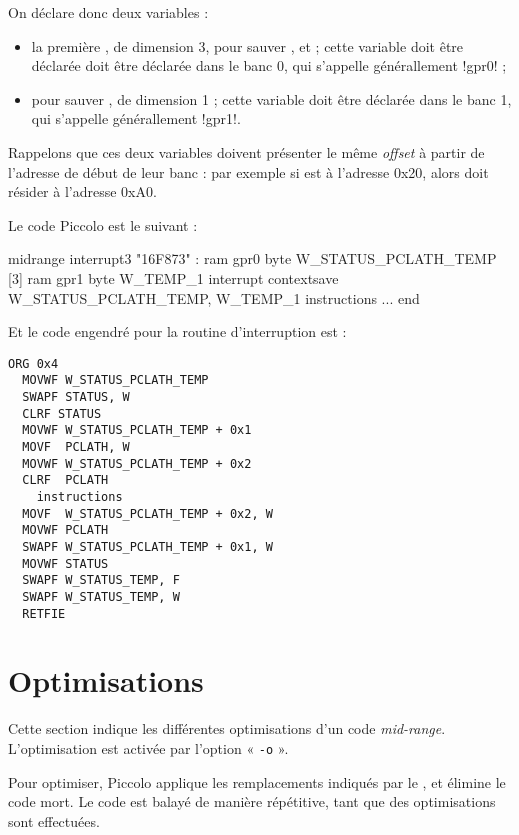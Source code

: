 On déclare donc deux variables :
\begin{itemize}
  \item la première , de dimension 3, pour sauver ,  et  ; cette variable doit être déclarée doit être déclarée dans le banc 0, qui s'appelle générallement \pic!gpr0! ; 
  \item {} pour sauver , de dimension 1 ; cette variable doit être déclarée dans le banc 1, qui s'appelle générallement \pic!gpr1!.

\end{itemize}

Rappelons que ces deux variables doivent présenter le même \emph{offset} à partir de l'adresse de début de leur banc : par exemple si  est à l'adresse 0x20, alors  doit résider à l'adresse 0xA0.

Le code Piccolo est le suivant :
\begin{piccolo}
midrange interrupt3 "16F873" :
ram gpr0 {
  byte W_STATUS_PCLATH_TEMP [3]
}
ram gpr1 {
  byte W_TEMP_1
}
interrupt contextsave W_STATUS_PCLATH_TEMP, W_TEMP_1 {
  instructions
}
...
end
\end{piccolo}

Et le code engendré pour la routine d'interruption est :
\begin{lstlisting}[language=assembleur]
  ORG 0x4
  MOVWF W_STATUS_PCLATH_TEMP
  SWAPF STATUS, W
  CLRF STATUS
  MOVWF W_STATUS_PCLATH_TEMP + 0x1
  MOVF  PCLATH, W
  MOVWF W_STATUS_PCLATH_TEMP + 0x2
  CLRF  PCLATH
    instructions
  MOVF  W_STATUS_PCLATH_TEMP + 0x2, W
  MOVWF PCLATH
  SWAPF W_STATUS_PCLATH_TEMP + 0x1, W
  MOVWF STATUS
  SWAPF W_STATUS_TEMP, F
  SWAPF W_STATUS_TEMP, W
  RETFIE
\end{lstlisting}









\section{Optimisations}

Cette section indique les différentes optimisations d'un code \emph{mid-range}. L'optimisation est activée par l'option « \texttt{-o} ».

Pour optimiser, Piccolo applique les remplacements indiqués par le , et élimine le code mort. Le code est balayé de manière répétitive, tant que des optimisations sont effectuées.

